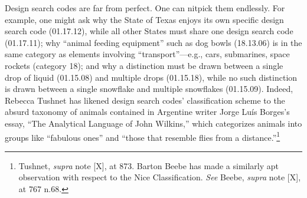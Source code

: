 \documentclass[letterpaper, 11pt, oneside]{article}
\begin{document}
Design search codes are far from perfect. One can nitpick them endlessly. For example, one might ask why the State of Texas enjoys its own specific design search code (01.17.12), while all other States must share one design search code (01.17.11); why ``animal feeding equipment'' such as dog bowls (18.13.06) is in the same category as elements involving ``transport''—e.g., cars, submarines, space rockets (category 18); and why a distinction must be drawn between a single drop of liquid (01.15.08) and multiple drops (01.15.18), while no such distinction is drawn between a single snowflake and multiple snowflakes (01.15.09). Indeed, Rebecca Tushnet has likened design search codes' classification scheme to the absurd taxonomy of animals contained in Argentine writer Jorge Luís Borges's essay, ``The Analytical Language of John Wilkins,'' which categorizes animals into groups like ``fabulous ones'' and ``those that resemble flies from a distance.''\footnote{Tushnet, \textit{supra} note [X], at 873. Barton Beebe has made a similarly apt observation with respect to the Nice Classification. \textit{See} Beebe, \textit{supra} note [X], at 767 n.68.}
\end{document}
